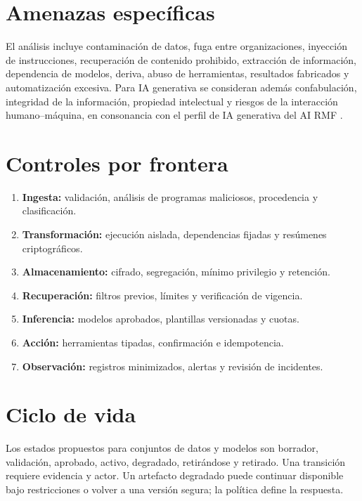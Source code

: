 \section{Amenazas específicas}

El análisis incluye contaminación de datos, fuga entre organizaciones, inyección de instrucciones,
recuperación de contenido prohibido, extracción de información, dependencia de modelos,
deriva, abuso de herramientas, resultados fabricados y automatización excesiva. Para IA
generativa se consideran además confabulación, integridad de la información, propiedad
intelectual y riesgos de la interacción humano--máquina, en consonancia con el perfil de
IA generativa del AI RMF \parencite{nist2024genai,nist2023airmf}.

\section{Controles por frontera}

\begin{enumerate}[leftmargin=*]
  \item \textbf{Ingesta:} validación, análisis de programas maliciosos, procedencia y clasificación.
  \item \textbf{Transformación:} ejecución aislada, dependencias fijadas y resúmenes criptográficos.
  \item \textbf{Almacenamiento:} cifrado, segregación, mínimo privilegio y retención.
  \item \textbf{Recuperación:} filtros previos, límites y verificación de vigencia.
  \item \textbf{Inferencia:} modelos aprobados, plantillas versionadas y cuotas.
  \item \textbf{Acción:} herramientas tipadas, confirmación e idempotencia.
  \item \textbf{Observación:} registros minimizados, alertas y revisión de incidentes.
\end{enumerate}

\section{Ciclo de vida}

Los estados propuestos para conjuntos de datos y modelos son borrador, validación, aprobado,
activo, degradado, retirándose y retirado. Una transición requiere evidencia y actor.
Un artefacto degradado puede continuar disponible bajo restricciones o volver a una
versión segura; la política define la respuesta.

